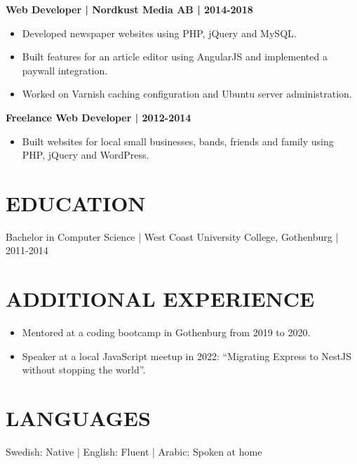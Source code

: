 \documentclass[11pt,a4paper]{article}
\begin{document}
\textbf{Web Developer | Nordkust Media AB | 2014-2018}
\begin{itemize}
\item Developed newspaper websites using PHP, jQuery and MySQL.
\item Built features for an article editor using AngularJS and implemented a paywall integration.
\item Worked on Varnish caching configuration and Ubuntu server administration.
\end{itemize}

\textbf{Freelance Web Developer | 2012-2014}
\begin{itemize}
\item Built websites for local small businesses, bands, friends and family using PHP, jQuery and WordPress.
\end{itemize}

\section*{EDUCATION}
Bachelor in Computer Science | West Coast University College, Gothenburg | 2011-2014

\section*{ADDITIONAL EXPERIENCE}
\begin{itemize}
\item Mentored at a coding bootcamp in Gothenburg from 2019 to 2020.
\item Speaker at a local JavaScript meetup in 2022: “Migrating Express to NestJS without stopping the world”.
\end{itemize}

\section*{LANGUAGES}
Swedish: Native | English: Fluent | Arabic: Spoken at home
\end{document}
